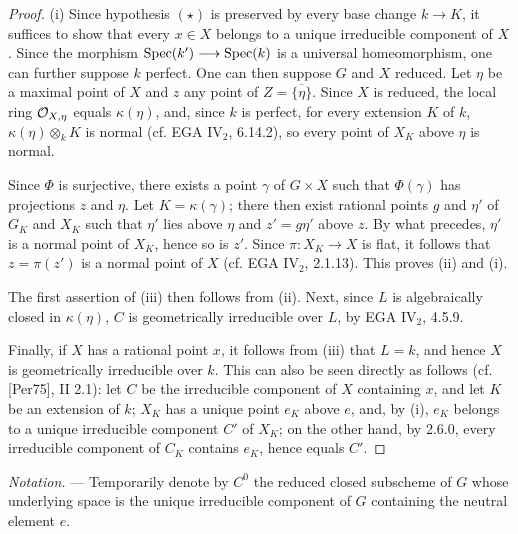 \begin{proof}
(i) Since hypothesis $(\star)$ is preserved by every base change $k\to K$, it suffices to show that every $x\in X$ belongs to a unique irreducible component of $X$. Since the morphism $\operatorname{Spec}(k')\longrightarrow\operatorname{Spec}(k)$ is a universal homeomorphism, one can further suppose $k$ perfect. One can then suppose $G$ and $X$ reduced. Let $\eta$ be a maximal point of $X$ and $z$ any point of $Z=\overline{\{\eta\}}$. Since $X$ is reduced, the local ring $\mathcal{O}_{X,\eta}$ equals $\kappa(\eta)$, and, since $k$ is perfect, for every extension $K$ of $k$, $\kappa(\eta)\otimes_kK$ is normal (cf. EGA IV$_2$, 6.14.2), so every point of $X_K$ above $\eta$ is normal.

Since $\Phi$ is surjective, there exists a point $\gamma$ of $G\times X$ such that $\Phi(\gamma)$ has projections $z$ and $\eta$. Let $K=\kappa(\gamma)$; there then exist rational points $g$ and $\eta'$ of $G_K$ and $X_K$ such that $\eta'$ lies above $\eta$ and $z'=g\eta'$ above $z$. By what precedes, $\eta'$ is a normal point of $X_K$, hence so is $z'$. Since $\pi:X_K\to X$ is flat, it follows that $z=\pi(z')$ is a normal point of $X$ (cf. EGA IV$_2$, 2.1.13). This proves (ii) and (i).

The first assertion of (iii) then follows from (ii). Next, since $L$ is algebraically closed in $\kappa(\eta)$, $C$ is geometrically irreducible over $L$, by EGA IV$_2$, 4.5.9.

Finally, if $X$ has a rational point $x$, it follows from (iii) that $L=k$, and hence $X$ is geometrically irreducible over $k$. This can also be seen directly as follows (cf. [Per75], II 2.1): let $C$ be the irreducible component of $X$ containing $x$, and let $K$ be an extension of $k$; $X_K$ has a unique point $e_K$ above $e$, and, by (i), $e_K$ belongs to a unique irreducible component $C'$ of $X_K$; on the other hand, by 2.6.0, every irreducible component of $C_K$ contains $e_K$, hence equals $C'$.
\end{proof}
\emph{Notation.} --- Temporarily denote by $C^0$ the reduced closed subscheme of $G$ whose underlying space is the unique irreducible component of $G$ containing the neutral element $e$.
